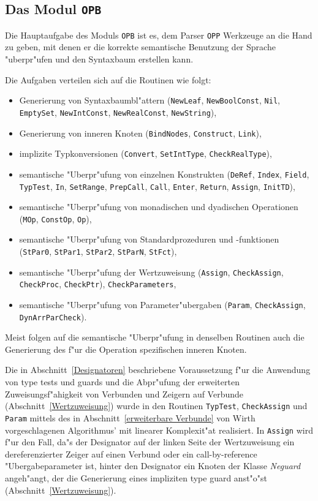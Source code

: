 \subsection{Das Modul {\tt OPB}}

Die Hauptaufgabe des Moduls {\tt OPB} ist es, dem Parser {\tt OPP} Werkzeuge
an die Hand zu geben, mit denen er die korrekte semantische Benutzung der
Sprache "uberpr"ufen und den Syntaxbaum erstellen kann.

Die Aufgaben verteilen sich auf die Routinen wie folgt:
\begin{itemize}
\item Generierung von Syntaxbaumbl"attern ({\tt NewLeaf}, {\tt NewBoolConst},
  {\tt Nil}, {\tt EmptySet}, {\tt NewIntConst}, {\tt NewRealConst},
  {\tt NewString}),
\item Generierung von inneren Knoten ({\tt BindNodes}, {\tt Construct},
  {\tt Link}),
\item implizite Typkonversionen ({\tt Convert}, {\tt SetIntType},
  {\tt CheckRealType}),
\item semantische "Uberpr"ufung von einzelnen Konstrukten ({\tt DeRef},
  {\tt Index}, {\tt Field}, {\tt TypTest}, {\tt In}, {\tt SetRange},
  {\tt PrepCall}, {\tt Call}, {\tt Enter}, {\tt Return}, {\tt Assign},
  {\tt InitTD}),
\item semantische "Uberpr"ufung von monadischen und dyadischen Operationen
  ({\tt MOp}, {\tt ConstOp}, {\tt Op}),
\item semantische "Uberpr"ufung von Standardprozeduren und -funktionen
  ({\tt StPar0}, {\tt StPar1}, {\tt StPar2}, {\tt StParN}, {\tt StFct}),
\item semantische "Uberpr"ufung der Wertzuweisung ({\tt Assign},
  {\tt CheckAssign}, {\tt CheckProc}, {\tt CheckPtr}), {\tt CheckParameters},
\item semantische "Uberpr"ufung von Parameter"ubergaben ({\tt Param},
  {\tt CheckAssign}, {\tt DynArrParCheck}).
\end{itemize}

\medskip
Meist folgen auf die semantische "Uberpr"ufung in denselben Routinen auch
die Generierung des f"ur die Operation spezifischen inneren Knoten.

Die in Abschnitt~\ref{Designatoren} beschriebene Voraussetzung f"ur die Anwendung
von type tests und guards und die Abpr"ufung der erweiterten Zuweisungsf"ahigkeit von
Verbunden und Zeigern auf Verbunde (Abschnitt~\ref{Wertzuweisung}) wurde in den
Routinen {\tt TypTest}, {\tt CheckAssign} und {\tt Param} mittels des in
Abschnitt~\ref{erweiterbare Verbunde} von Wirth vorgeschlagenen Algorithmus'
mit linearer Komplexit"at realisiert.
In {\tt Assign} wird f"ur den Fall, da"s der Designator auf der linken Seite
der Wertzuweisung ein dereferenzierter Zeiger auf einen Verbund oder ein
call-by-reference "Ubergabeparameter ist, hinter den Designator ein Knoten
der Klasse {\it Neguard\/} angeh"angt, der die Generierung eines impliziten
type guard anst"o"st (Abschnitt~\ref{Wertzuweisung}).

